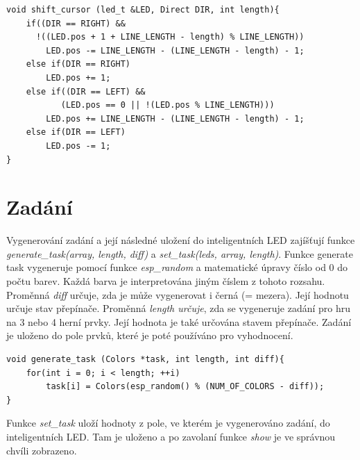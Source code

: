 \begin{minipage}{\linewidth}
\begin{lstlisting}[frame=single,numbers=right,caption={Funkce posouvající kurzor.},label=lst:priklad.vypis.kodu.C,basicstyle=\ttfamily\small, keywordstyle=\color{black}\bfseries\underbar,]
void shift_cursor (led_t &LED, Direct DIR, int length){
    if((DIR == RIGHT) && 
      !((LED.pos + 1 + LINE_LENGTH - length) % LINE_LENGTH))
        LED.pos -= LINE_LENGTH - (LINE_LENGTH - length) - 1;
    else if(DIR == RIGHT)
        LED.pos += 1;
    else if((DIR == LEFT) && 
           (LED.pos == 0 || !(LED.pos % LINE_LENGTH)))
        LED.pos += LINE_LENGTH - (LINE_LENGTH - length) - 1;
    else if(DIR == LEFT)
        LED.pos -= 1;
}   
\end{lstlisting}
\end{minipage} 

\section{Zadání}
Vygenerování zadání a její následné uložení do inteligentních LED zajíšťují funkce {\it generate\_task(array, length, diff)} a {\it set\_task(leds, array, length)}.
Funkce generate task vygeneruje pomocí funkce {\it esp\_random} a matematické úpravy číslo od 0 do počtu barev. Každá barva je interpretována jiným číslem z tohoto 
rozsahu. Proměnná {\it diff} určuje, zda je může vygenerovat i černá (= mezera). Její hodnotu určuje stav přepínače. Proměnná {\it length určuje}, zda se vygeneruje zadání 
pro hru na 3 nebo 4 herní prvky. Její hodnota je také určována stavem přepínače. Zadání je uloženo do pole prvků, které je poté používáno pro vyhodnocení.

\begin{minipage}{\linewidth}
\begin{lstlisting}[frame=single,numbers=right,caption={Funkce pro vygenerování zadání.},label=lst:priklad.vypis.kodu.C,basicstyle=\ttfamily\small, keywordstyle=\color{black}\bfseries\underbar,]
void generate_task (Colors *task, int length, int diff){
    for(int i = 0; i < length; ++i)
        task[i] = Colors(esp_random() % (NUM_OF_COLORS - diff));
}      
\end{lstlisting}
\end{minipage} 

Funkce {\it set\_task} uloží hodnoty z pole, ve kterém je vygenerováno zadání, do inteligentních LED. Tam je uloženo a po zavolaní funkce {\it show} je ve správnou 
chvíli zobrazeno.

